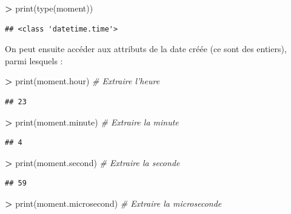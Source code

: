 \documentclass[12pt,]{book}
\newenvironment{Shaded}{\begin{snugshade}}{\end{snugshade}}
\newcommand{\CommentTok}[1]{\textcolor[rgb]{0.56,0.35,0.01}{\textit{#1}}}
\newcommand{\OperatorTok}[1]{\textcolor[rgb]{0.81,0.36,0.00}{\textbf{#1}}}
\newcommand{\BuiltInTok}[1]{#1}
\newcommand{\NormalTok}[1]{#1}
\numberwithin{equation}{section}
\numberwithin{countremarque}{section}
\begin{document}
\begin{Shaded}
\begin{Highlighting}[]
\OperatorTok{>} \BuiltInTok{print}\NormalTok{(}\BuiltInTok{type}\NormalTok{(moment))}
\end{Highlighting}
\end{Shaded}

\begin{lstlisting}
## <class 'datetime.time'>
\end{lstlisting}

On peut ensuite accéder aux attributs de la date créée (ce sont des
entiers), parmi lesquels :

\begin{Shaded}
\begin{Highlighting}[]
\OperatorTok{>} \BuiltInTok{print}\NormalTok{(moment.hour) }\CommentTok{# Extraire l'heure}
\end{Highlighting}
\end{Shaded}

\begin{lstlisting}
## 23
\end{lstlisting}

\begin{Shaded}
\begin{Highlighting}[]
\OperatorTok{>} \BuiltInTok{print}\NormalTok{(moment.minute) }\CommentTok{# Extraire la minute}
\end{Highlighting}
\end{Shaded}

\begin{lstlisting}
## 4
\end{lstlisting}

\begin{Shaded}
\begin{Highlighting}[]
\OperatorTok{>} \BuiltInTok{print}\NormalTok{(moment.second) }\CommentTok{# Extraire la seconde}
\end{Highlighting}
\end{Shaded}

\begin{lstlisting}
## 59
\end{lstlisting}

\begin{Shaded}
\begin{Highlighting}[]
\OperatorTok{>} \BuiltInTok{print}\NormalTok{(moment.microsecond) }\CommentTok{# Extraire la microseconde}
\end{Highlighting}
\end{Shaded}
\end{document}
